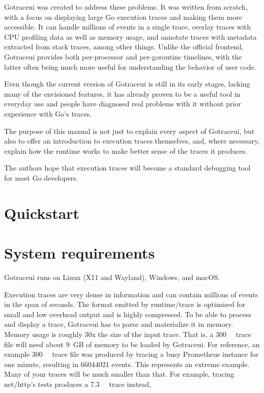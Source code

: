 \documentclass[10pt,letterpaper,oneside,openany,showtrims]{memoir}
\newcommand{\code}[1]{{\ttfamily\mbox{#1}}}
\begin{document}
Gotraceui was created to address these problems.
It was written from scratch, with a focus on displaying large Go execution traces and making them more accessible.
It can handle millions of events in a single trace, overlay traces with CPU profiling data as well as memory usage,
and annotate traces with metadata extracted from stack traces, among other things.
Unlike the official frontend, Gotraceui provides both per-processor and per-goroutine timelines,
with the latter often being much more useful for understanding the behavior of user code.

Even though the current version of Gotraceui is still in its early stages,
lacking many of the envisioned features,
it has already proven to be a useful tool in everyday use
and people have diagnosed real problems with it without prior experience with Go's traces.

The purpose of this manual is not just to explain every aspect of Gotraceui,
but also to offer an introduction to execution traces themselves,
and, where necessary, explain how the runtime works to make better sense of the traces it produces.

The authors hope that execution traces will become a standard debugging tool for most Go developers.

\chapter{Quickstart}

\chapter{System requirements}

Gotraceui runs on Linux (X11 and Wayland), Windows, and macOS.

Execution traces are very dense in information and can contain millions of events in the span of seconds.
The format emitted by \code{runtime/trace} is optimized for small and low overhead output and is highly compressed.
To be able to process and display a trace, Gotraceui has to parse and materialize it in memory.
Memory usage is roughly 30x the size of the input trace.
That is, a \qty{300}{\mega\byte} trace file will need about \qty{9}{GB} of memory to be loaded by Gotraceui.
For reference, an example \qty{300}{\mega\byte} trace file was produced by tracing a busy Prometheus instance for one minute,
resulting in \qty{66044021}{} events.
This represents an extreme example.
Many of your traces will be much smaller than that.
For example, tracing \code{net/http}'s tests produces a \qty{7.3}{\mega\byte} trace instead, 
\end{document}
